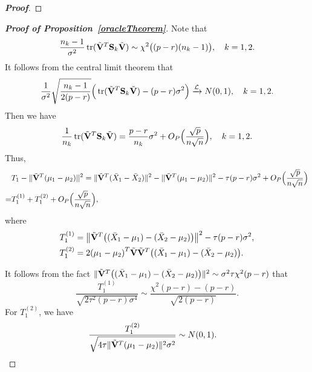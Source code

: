 \documentclass[3p]{elsarticle}
\DeclareMathOperator{\mytr}{tr}
\theoremstyle{plain}
\theoremstyle{definition}
\theoremstyle{remark}
\begin{document}
\begin{appendices}
\begin{proof}[\textbf{Proof}]
\end{proof}


\begin{proof}[\textbf{Proof of Proposition~\ref{oracleTheorem}}]
    Note that
    $$
    \frac{n_k-1}{\sigma^2} \mytr(\tilde{\BV}^T \BS_k \tilde{\BV})\sim \chi^2\big((p-r)(n_k-1)\big),\quad k=1,2.
    $$
    It follows from the central limit theorem that
    \begin{equation*}
        \begin{aligned}
            \frac{1}{\sigma^2}\sqrt{\frac{n_k-1}{2(p-r)}}\Big( \mytr(\tilde{\BV}^T \BS_k \tilde{\BV})-(p-r)\sigma^2\Big)\xrightarrow{\mathcal{L}}N(0,1),\quad k=1,2.
        \end{aligned}
    \end{equation*}
    Then we have
    $$
           \frac{1}{n_k} \mytr(\tilde{\BV}^T \BS_k \tilde{\BV}) =
            \frac{p-r}{n_k}\sigma^2 + O_P\Big(\frac{\sqrt{p}}{n\sqrt{n}}\Big),\quad k=1,2.
    $$
    Thus,
    \begin{equation*}\label{prop1eq2}
        \begin{aligned}
            &T_1-\|\tilde{\mathbf{V}}^T(\mu_1-\mu_2)\|^2=
            \|\tilde{\mathbf{V}}^T(\bar{X}_1-\bar{X}_2)\|^2-
            \|\tilde{\mathbf{V}}^T(\mu_1-\mu_2)\|^2
            -  \tau (p-r)\sigma^2 + O_P\Big(\frac{\sqrt{p}}{n\sqrt{n}}\Big)\\
            =&
            T_1^{(1)}+T_1^{(2)}
            + O_P\Big(\frac{\sqrt{p}}{n\sqrt{n}}\Big)
            ,
        \end{aligned}
    \end{equation*}
    where
    \begin{align*}
        T_1^{(1)}&=\big\|\tilde{\mathbf{V}}^T\big((\bar{X}_1-\mu_1)-(\bar{X}_2-\mu_2)\big)\big\|^2   -  \tau (p-r)\sigma^2, \\
        T_1^{(2)}&=2{(\mu_1-\mu_2)}^T\tilde{\mathbf{V}}\tilde{\mathbf{V}}^T\big((\bar{X}_1-\mu_1)-(\bar{X}_2-\mu_2)\big).
    \end{align*}

It follows from the fact
$\|\tilde{\mathbf{V}}^T \big( (\bar{X}_1-\mu_1)-(\bar{X}_2-\mu_2) \big)\|^2\sim \sigma^2\tau\chi^2(p-r)$ that
$$
            \frac{T_1^{(1)}}{\sqrt{2\tau^2 (p-r)\sigma^4}}\sim \frac{\chi^2 (p-r)- (p-r)}{\sqrt{2(p-r)}}.
    $$
    For $T_1^{(2)}$, we have
    \begin{equation*}
        \begin{aligned}
            &\frac{T_1^{(2)}}{\sqrt{4\tau\|\tilde{\mathbf{V}}^T(\mu_1-\mu_2)\|^2\sigma^2}}
            \sim N(0,1).
        \end{aligned}
    \end{equation*}


\end{proof}
\end{appendices}
\end{document}
